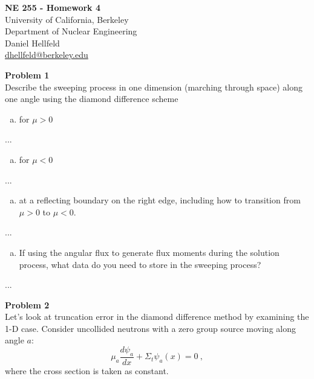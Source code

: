 \documentclass[10pt]{article}
\begin{document}
\begin{centering}
\textbf{\large NE 255 - Homework 4}\\
\vspace{10pt}
University of California, Berkeley\\
Department of Nuclear Engineering\\
\vspace{10pt}
Daniel Hellfeld\\
\href{mailto:dhellfeld@berkeley.edu}{dhellfeld@berkeley.edu}\\
\end{centering}




\vspace{20pt}
\noindent \textbf{Problem 1}\\
Describe the sweeping process in one dimension (marching through space) along one angle using the diamond difference scheme
%
\begin{enumerate}[(a)]
\item for $\mu > 0$
\end{enumerate}

...

\begin{enumerate}[(b)]
\item for $\mu < 0$
\end{enumerate}

...


\begin{enumerate}[(c)]
\item at a reflecting boundary on the right edge, including how to transition from $\mu > 0$ to $\mu < 0$.
\end{enumerate}

...


\begin{enumerate}[(d)]
\item If using the angular flux to generate flux moments during the solution process, what data do you need to store in the sweeping process?
\end{enumerate}

...




\newpage
\noindent \textbf{Problem 2}\\
Let's look at truncation error in the diamond difference method by examining the 1-D case. Consider uncollided neutrons with a zero group source moving along angle $a$:
%
\begin{equation*}
\mu_a \frac{d \psi_a}{dx} + \Sigma_t \psi_a(x) = 0\:,
\end{equation*}
where the cross section is taken as constant.
\end{document}

